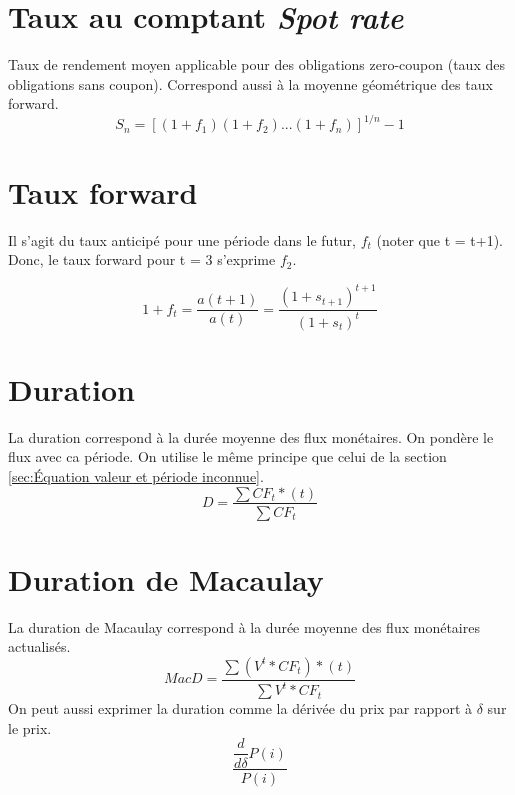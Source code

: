 \documentclass[11pt,french]{report}
\begin{document}
\section{Taux au comptant \emph{Spot rate}}
\label{sec:spot rate}

Taux de rendement moyen applicable pour des obligations zero-coupon (taux des obligations sans coupon). Correspond aussi à la moyenne géométrique des taux forward.
\begin{equation}
S_n = [(1+f_1)(1+f_2)...(1+f_n)]^{1/n} - 1
\end{equation}

\section{Taux forward}

Il s'agit du taux anticipé pour une période dans le futur,  $f_t$ (noter que t = t+1). Donc, le taux forward pour t = 3 s'exprime $ f_2 $.

\begin{equation}
1+f_t = \frac{a(t+1)}{a(t)} = \frac{(1+s_{t+1})^{t+1}}{(1+s_{t})^{t}}
\end{equation}

\section{Duration}
\label{duration}

La duration correspond à la durée moyenne des flux monétaires. On pondère le flux avec ca période. On utilise le même principe  que celui de la section \ref{sec:Équation valeur et période inconnue}.
\begin{equation}
D = \frac{\sum CF_{t}*(t)} {\sum CF_{t}}
\end{equation}

\section{Duration de Macaulay}
\label{sec:duration macaulay}

La duration de Macaulay correspond à la durée moyenne des flux monétaires actualisés.
\begin{equation}
MacD = \frac{\sum (V^{t}*CF_{t})*(t)}{\sum V^{t}*CF_{t}}
\end{equation}
On peut aussi exprimer la duration comme la dérivée du prix par rapport à $\delta$ sur le prix. 
\begin{equation}
\frac{\dfrac{d}{d\delta}P(i)}{P(i)} 
\end{equation}
\end{document}
